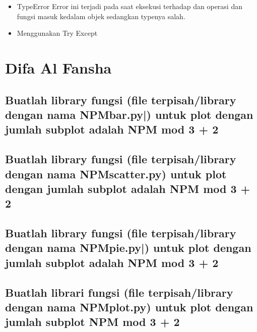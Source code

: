 \begin{enumerate}
\begin{itemize}
\item TypeError
Error ini terjadi pada saat eksekusi terhadap dan operasi dan fungsi masuk kedalam objek sedangkan typenya salah.\\

\item Menggunakan Try Except \\


\end{itemize}

\end{enumerate}

\section{Difa Al Fansha}
\subsection{Buatlah library fungsi (file terpisah/library dengan nama NPM\textunderscore bar.py|) untuk plot dengan jumlah subplot adalah NPM mod 3 + 2}


\subsection{Buatlah library fungsi (file terpisah/library dengan nama NPM\textunderscore scatter.py) untuk plot dengan jumlah subplot adalah NPM mod 3 + 2}


\subsection{Buatlah library fungsi (file terpisah/library dengan nama NPM\textunderscore pie.py|) untuk plot dengan jumlah subplot adalah NPM mod 3 + 2}


\subsection{Buatlah librari fungsi (file terpisah/library dengan nama NPM\textunderscore plot.py) untuk plot dengan jumlah subplot NPM mod 3 + 2}


